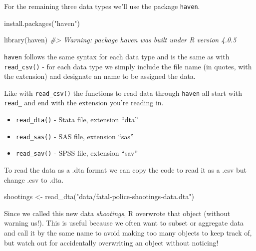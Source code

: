 \documentclass[
  12pt,
  openany]{book}
\newenvironment{Shaded}{\begin{snugshade}}{\end{snugshade}}
\newcommand{\CommentTok}[1]{\textcolor[rgb]{0.37,0.37,0.37}{\textit{#1}}}
\newcommand{\FunctionTok}[1]{\textcolor[rgb]{0,0,0}{#1}}
\newcommand{\NormalTok}[1]{#1}
\newcommand{\OtherTok}[1]{\textcolor[rgb]{0.37,0.37,0.37}{#1}}
\newcommand{\StringTok}[1]{\textcolor[rgb]{0.5,0.5,0.5}{#1}}
\providecommand{\tightlist}{%
  \setlength{\itemsep}{0pt}\setlength{\parskip}{0pt}}
\begin{document}
For the remaining three data types we'll use the package \texttt{haven}.

\begin{Shaded}
\begin{Highlighting}[]
\FunctionTok{install.packages}\NormalTok{(}\StringTok{"haven"}\NormalTok{)}
\end{Highlighting}
\end{Shaded}

\begin{Shaded}
\begin{Highlighting}[]
\FunctionTok{library}\NormalTok{(haven)}
\CommentTok{\#\textgreater{} Warning: package \textquotesingle{}haven\textquotesingle{} was built under R version 4.0.5}
\end{Highlighting}
\end{Shaded}

\texttt{haven} follows the same syntax for each data type and is the same as with \texttt{read\_csv()} - for each data type we simply include the file name (in quotes, with the extension) and designate an name to be assigned the data.

Like with \texttt{read\_csv()} the functions to read data through \texttt{haven} all start with \texttt{read\_} and end with the extension you're reading in.

\begin{itemize}
\tightlist
\item
  \texttt{read\_dta()} - Stata file, extension ``dta''
\item
  \texttt{read\_sas()} - SAS file, extension ``sas''
\item
  \texttt{read\_sav()} - SPSS file, extension ``sav''
\end{itemize}

To read the data as a .dta format we can copy the code to read it as a .csv but change .csv to .dta.

\begin{Shaded}
\begin{Highlighting}[]
\NormalTok{shootings }\OtherTok{\textless{}{-}} \FunctionTok{read\_dta}\NormalTok{(}\StringTok{"data/fatal{-}police{-}shootings{-}data.dta"}\NormalTok{)}
\end{Highlighting}
\end{Shaded}

Since we called this new data \emph{shootings}, R overwrote that object (without warning us!). This is useful because we often want to subset or aggregate data and call it by the same name to avoid making too many objects to keep track of, but watch out for accidentally overwriting an object without noticing!
\end{document}
